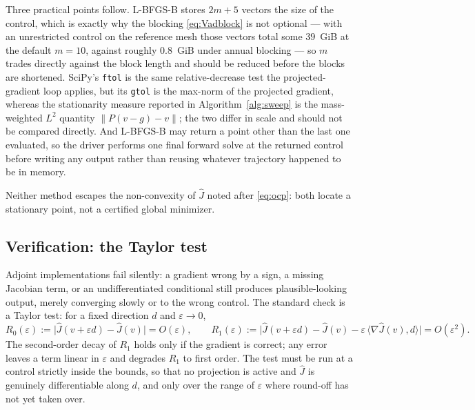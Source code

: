 \documentclass[11pt]{article}
\begin{document}
Three practical points follow. L-BFGS-B stores $2m+5$ vectors the size of the control, which is exactly why the blocking \eqref{eq:Vadblock} is not optional --- with an unrestricted control on the reference mesh those vectors total some $39$~GiB at the default $m=10$, against roughly $0.8$~GiB under annual blocking --- so $m$ trades directly against the block length and should be reduced before the blocks are shortened. SciPy's \texttt{ftol} is the same relative-decrease test the projected-gradient loop applies, but its \texttt{gtol} is the max-norm of the projected gradient, whereas the stationarity measure reported in Algorithm~\ref{alg:sweep} is the mass-weighted $L^2$ quantity $\lVert P(v-g)-v\rVert$; the two differ in scale and should not be compared directly. And L-BFGS-B may return a point other than the last one evaluated, so the driver performs one final forward solve at the returned control before writing any output rather than reusing whatever trajectory happened to be in memory.

Neither method escapes the non-convexity of $\hat J$ noted after \eqref{eq:ocp}: both locate a stationary point, not a certified global minimizer.

\subsection{Verification: the Taylor test}
\label{sec:verification}

Adjoint implementations fail silently: a gradient wrong by a sign, a missing Jacobian term, or an undifferentiated conditional still produces plausible-looking output, merely converging slowly or to the wrong control. The standard check is a Taylor test: for a fixed direction $d$ and $\varepsilon\to0$,
\begin{equation}
R_0(\varepsilon) := \big|\hat J(v+\varepsilon d) - \hat J(v)\big| = O(\varepsilon),
\qquad
R_1(\varepsilon) := \big|\hat J(v+\varepsilon d) - \hat J(v) - \varepsilon\,\langle \nabla\hat J(v), d\rangle\big| = O(\varepsilon^2).
\end{equation}
The second-order decay of $R_1$ holds only if the gradient is correct; any error leaves a term linear in $\varepsilon$ and degrades $R_1$ to first order. The test must be run at a control strictly inside the bounds, so that no projection is active and $\hat J$ is genuinely differentiable along $d$, and only over the range of $\varepsilon$ where round-off has not yet taken over.

\end{document}
